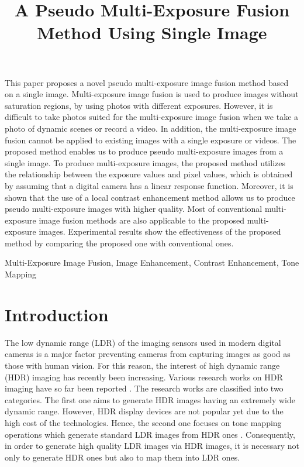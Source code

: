 \documentclass[paper]{ieice}
\title{A Pseudo Multi-Exposure Fusion Method Using Single Image}
\begin{document}
\setlength{\tabcolsep}{3.0pt}

\maketitle
\begin{summary}
  This paper proposes a novel pseudo multi-exposure image fusion method
  based on a single image.
  Multi-exposure image fusion is used to produce images without saturation regions,
  by using photos with different exposures.
  However, it is difficult to take photos suited for the
  multi-exposure image fusion when we take a photo of dynamic scenes or
  record a video.
  In addition, the multi-exposure image fusion
  cannot be applied to existing images with a single exposure or videos.
  The proposed method enables us to produce pseudo multi-exposure images from a
  single image.
  To produce multi-exposure images, the proposed method
  utilizes the relationship between the exposure values and pixel values,
  which is obtained by assuming that a digital camera has a
  linear response function.
  Moreover, it is shown that the use of a local contrast enhancement method
  allows us to produce pseudo multi-exposure images with higher quality.
  Most of conventional multi-exposure image fusion methods are also applicable to
  the proposed multi-exposure images.
  Experimental results show the effectiveness of the proposed method by
  comparing the proposed one with conventional ones.
\end{summary}
\begin{keywords}
  Multi-Exposure Image Fusion, Image Enhancement, Contrast Enhancement, Tone Mapping
\end{keywords}

\section{Introduction}
  The low dynamic range (LDR) of the imaging sensors used in modern digital cameras
  is a major factor preventing cameras from capturing images as good as those with human vision.
  For this reason, the interest of high dynamic range (HDR) imaging has
  recently been increasing.
  Various research works on HDR imaging have so far been reported
  \cite{schoberl2013evaluation,chalmers2009high,debevec1997recovering,oh2015robust,
  kinoshita2016remapping,kinoshita2017fast,kinoshita2017fast_trans,huo2016single}.
  The research works are classified into two categories.
  The first one aims to generate HDR images having an extremely wide dynamic range.
  However, HDR display devices are not popular yet due to the high cost of
  the technologies.
  Hence, the second one focuses on tone mapping operations
  which generate standard LDR images from HDR ones
  \cite{murofushi2013integer, murofushi2014integer, dobashi2014fixed}.
  Consequently, in order to generate high quality LDR images via HDR images,
  it is necessary not only to generate HDR ones but also to map them into LDR ones.
  
\end{document}
